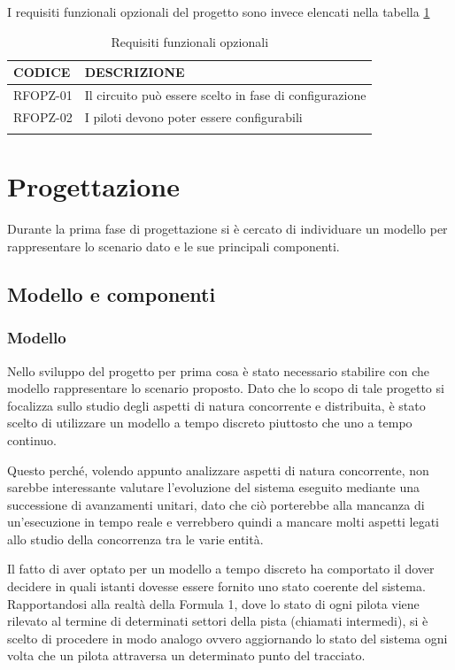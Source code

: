 \documentclass[a4paper,11pt, twoside, openright]{book}
\begin{document}
    I requisiti funzionali opzionali del progetto sono invece elencati nella tabella \ref{tbl:RequisitiFunzionaliOpzionali}
    
    \begin{longtable}{|p{2cm}|p{8cm}|}
      \toprule
	\bfseries{CODICE} & \bfseries{DESCRIZIONE} \\\hline
      \endfirsthead
      RFOPZ-01 & Il circuito può essere scelto in fase di configurazione \\\cline{1-2}
      RFOPZ-02 & I piloti devono poter essere configurabili \\\cline{1-2}
      \caption{Requisiti funzionali opzionali}
      \label{tbl:RequisitiFunzionaliOpzionali}
    \end{longtable}
    
  
  \chapter{Progettazione}
    Durante la prima fase di progettazione si è cercato di individuare un modello per rappresentare
    lo scenario dato e le sue principali componenti.
    
    \section{Modello e componenti}
      \subsection{Modello}
      \label{Modello}
	Nello sviluppo del progetto 
	per prima cosa è stato necessario stabilire con che modello rappresentare lo scenario proposto. Dato che lo scopo
	di tale progetto
        si focalizza sullo studio degli aspetti di natura concorrente e distribuita, è stato scelto di utilizzare un
	modello a tempo discreto piuttosto che uno a tempo continuo.
	
	Questo perché, volendo appunto analizzare aspetti di natura concorrente, non sarebbe interessante 
	valutare l'evoluzione del sistema eseguito mediante una successione di avanzamenti unitari, dato
	che ciò porterebbe alla mancanza di un'esecuzione in tempo reale e verrebbero quindi a mancare
	molti aspetti legati allo studio della concorrenza tra le varie entità.
	
	Il fatto di aver optato per un modello a tempo discreto ha comportato il dover decidere
	in quali istanti dovesse essere fornito uno stato coerente del sistema. Rapportandosi
	alla realtà della Formula 1, dove lo stato di ogni pilota viene rilevato al termine di determinati 
	settori della pista (chiamati intermedi),
	si è scelto di procedere in modo analogo ovvero aggiornando lo stato del sistema ogni volta che
	un pilota attraversa un determinato punto del tracciato.
\end{document}
